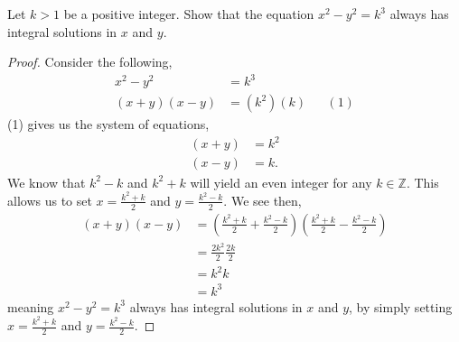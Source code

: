\documentclass[11pt]{article}
\newenvironment{problem}[2][Problem\!]{\begin{trivlist}
\item[\hskip \labelsep {\bfseries #1}\hskip \labelsep {\bfseries #2}]}{\end{trivlist}}
\newcommand{\zz}{\mathbb Z}   %
\begin{document}
\begin{tcolorbox}
    \begin{problem} {IC | 12-03 | PP 42}
      Let $k > 1$ be a positive integer. Show that the equation $x^{2} -y^{2} = k^{3}$
  always has integral solutions in $x$ and $y$.
    \end{problem}
  \end{tcolorbox}
  \begin{proof}
      Consider the following,
      \begin{align*}
          x^{2} - y^{2} &= k^{3} \\
          (x+y)(x-y) &= (k^{2})(k) && (1)
      \end{align*}
      (1) gives us the system of equations,
      \begin{align*}
          (x+y) &= k^{2} \\
          (x-y) &= k.
      \end{align*}
      We know that $k^{2} - k$ and $k^{2} +k $ will yield an even integer for any $k \in \zz$. This allows us to set $x = \frac{k^{2} + k}{2}$ and $y = \frac{k^{2} - k}{2}$. We see then,
      \begin{align*}
          (x+y)(x-y) &= (\frac{k^{2} + k}{2} + \frac{k^{2} - k}{2})(\frac{k^{2} + k}{2} -\frac{k^{2} - k}{2}) \\
          &= \frac{2k^{2}}{2}\frac{2k}{2} \\
          &= k^{2}k\\
          &= k^{3}
      \end{align*}
      meaning $x^{2}-y^{2} = k^{3}$ always has integral solutions in $x$ and $y$, by simply setting $x = \frac{k^{2} + k}{2}$ and $y = \frac{k^{2} - k}{2}$.
    \end{proof}

\end{document}
